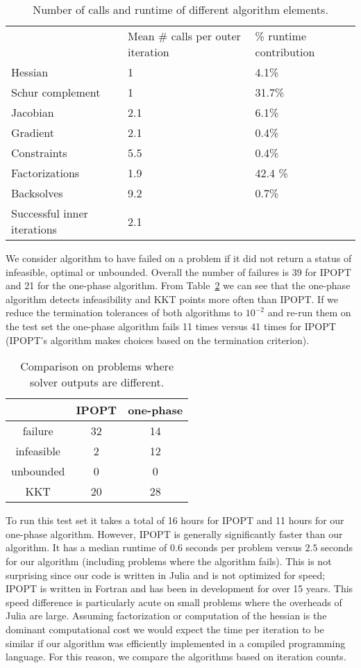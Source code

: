 \documentclass{article}
\begin{document}
\begin{table}[H]
\begin{tabular}{l  p{3.0cm} l}
&   Mean \# calls per outer iteration & \% runtime contribution \\ 
Hessian & 1 & 4.1\% \\  
Schur complement &1 & 31.7\% \\
Jacobian & 2.1 & 6.1\%  \\
Gradient & 2.1 & 0.4\%  \\
Constraints & 5.5 & 0.4\% \\
Factorizations & 1.9  & 42.4 \%  \\
Backsolves & 9.2 & 0.7\% \\
Successful inner iterations & 2.1 & \\
\end{tabular}
\caption{Number of calls and runtime of different algorithm elements.}\label{avg:evaluations}
\end{table}


We consider algorithm to have failed on a problem if it did not return a status of infeasible, optimal or unbounded. Overall the number of failures is 39 for IPOPT and 21 for the one-phase algorithm. From Table~\ref{compare-outputs} we can see that the one-phase algorithm detects infeasibility and KKT points more often than IPOPT. If we reduce the termination tolerances of both algorithms to $10^{-2}$ and re-run them on the test set the one-phase algorithm fails 11 times versus 41 times for IPOPT (IPOPT's algorithm makes choices based on the termination criterion).

\begin{table}[H]
\caption{Comparison on problems where solver outputs are different.}\label{compare-outputs}
\begin{tabular}{| c | c | c |}
& IPOPT & one-phase \\
\hline
failure &  32 & 14 \\ 
infeasible & 2 & 12 \\  
unbounded & 0 & 0 \\
KKT & 20 & 28 
\end{tabular}
\end{table}

To run this test set it takes a total of 16 hours for IPOPT and 11 hours for our one-phase algorithm. However, IPOPT is generally significantly faster than our algorithm. It has a median runtime of $0.6$ seconds per problem versus $2.5$ seconds for our algorithm (including problems where the algorithm fails). This is not surprising since our code is written in Julia and is not optimized for speed; IPOPT is written in Fortran and has been in development for over 15 years. This speed difference is particularly acute on small problems where the overheads of Julia are large. Assuming factorization or computation of the hessian is the dominant computational cost we would expect the time per iteration to be similar if our algorithm was efficiently implemented in a compiled programming language. For this reason, we compare the algorithms based on iteration counts.
\end{document}
